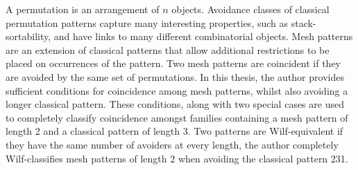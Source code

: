 A permutation is an arrangement of \(n\) objects.
Avoidance classes of classical permutation patterns
capture many interesting properties, such as
stack-sortability, and have links to many different combinatorial objects.
Mesh patterns are an extension of classical patterns that allow additional
restrictions to be placed on occurrences of the pattern.
Two mesh patterns are coincident if they are avoided by the same set of
permutations. In this thesis, the author provides sufficient conditions for
coincidence among mesh patterns, whilst also avoiding a longer classical
pattern. These conditions, along with two special cases are used to completely
classify coincidence amongst families containing a mesh pattern of length 2
and a classical pattern of length 3. Two patterns are Wilf-equivalent if they
have the same number of avoiders at every length, the author completely
Wilf-classifies mesh patterns of length 2 when avoiding the classical pattern 231.
